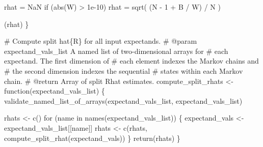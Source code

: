 \documentclass[
  letterpaper,
  DIV=11,
  numbers=noendperiod]{scrartcl}
\newenvironment{Shaded}{\begin{snugshade}}{\end{snugshade}}
\newcommand{\BuiltInTok}[1]{\textcolor[rgb]{0.00,0.23,0.31}{#1}}
\newcommand{\CommentTok}[1]{\textcolor[rgb]{0.37,0.37,0.37}{#1}}
\newcommand{\ControlFlowTok}[1]{\textcolor[rgb]{0.00,0.23,0.31}{#1}}
\newcommand{\DecValTok}[1]{\textcolor[rgb]{0.68,0.00,0.00}{#1}}
\newcommand{\FloatTok}[1]{\textcolor[rgb]{0.68,0.00,0.00}{#1}}
\newcommand{\KeywordTok}[1]{\textcolor[rgb]{0.00,0.23,0.31}{#1}}
\newcommand{\NormalTok}[1]{\textcolor[rgb]{0.00,0.23,0.31}{#1}}
\newcommand{\OperatorTok}[1]{\textcolor[rgb]{0.37,0.37,0.37}{#1}}
\newcommand{\StringTok}[1]{\textcolor[rgb]{0.13,0.47,0.30}{#1}}
\begin{document}
\begin{Shaded}
\begin{Highlighting}[]
\NormalTok{  rhat }\OperatorTok{=}\NormalTok{ NaN}
  \ControlFlowTok{if}\NormalTok{ (}\BuiltInTok{abs}\NormalTok{(W) }\OperatorTok{\textgreater{}} \FloatTok{1e{-}10}\NormalTok{)}
\NormalTok{    rhat }\OperatorTok{=}\NormalTok{ sqrt( (N }\OperatorTok{{-}} \DecValTok{1} \OperatorTok{+}\NormalTok{ B }\OperatorTok{/}\NormalTok{ W) }\OperatorTok{/}\NormalTok{ N )}

\NormalTok{  (rhat)}
\NormalTok{\}}
\end{Highlighting}
\end{Shaded}

\begin{Shaded}
\begin{Highlighting}[]
\CommentTok{\# Compute split hat\{R\} for all input expectands.}
\CommentTok{\# @param expectand\_vals\_list A named list of two{-}dimensional arrays for}
\CommentTok{\#                            each expectand.  The first dimension of}
\CommentTok{\#                            each element indexes the Markov chains and}
\CommentTok{\#                            the second dimension indexes the sequential}
\CommentTok{\#                            states within each Markov chain.}
\CommentTok{\# @return Array of split Rhat estimates.}
\NormalTok{compute\_split\_rhats }\OperatorTok{\textless{}{-}}\NormalTok{ function(expectand\_vals\_list) \{}
\NormalTok{  validate\_named\_list\_of\_arrays(expectand\_vals\_list,}
                                \StringTok{\textquotesingle{}expectand\_vals\_list\textquotesingle{}}\NormalTok{)}

\NormalTok{  rhats }\OperatorTok{\textless{}{-}}\NormalTok{ c()}
  \ControlFlowTok{for}\NormalTok{ (name }\KeywordTok{in}\NormalTok{ names(expectand\_vals\_list)) \{}
\NormalTok{    expectand\_vals }\OperatorTok{\textless{}{-}}\NormalTok{ expectand\_vals\_list[[name]]}
\NormalTok{    rhats }\OperatorTok{\textless{}{-}}\NormalTok{ c(rhats, compute\_split\_rhat(expectand\_vals))}
\NormalTok{  \}}
  \ControlFlowTok{return}\NormalTok{(rhats)}
\NormalTok{\}}
\end{Highlighting}
\end{Shaded}
\end{document}
